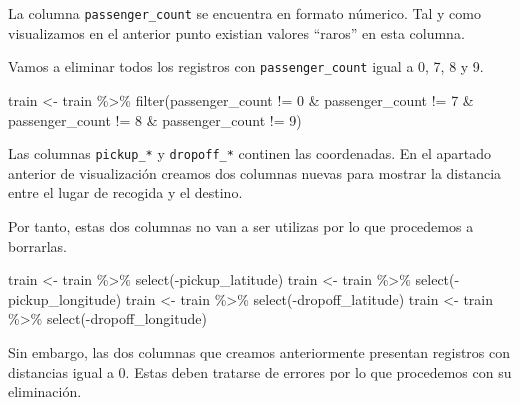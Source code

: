 \documentclass[
]{article}
\newenvironment{Shaded}{\begin{snugshade}}{\end{snugshade}}
\newcommand{\DecValTok}[1]{\textcolor[rgb]{0.00,0.00,0.81}{#1}}
\newcommand{\FunctionTok}[1]{\textcolor[rgb]{0.00,0.00,0.00}{#1}}
\newcommand{\NormalTok}[1]{#1}
\newcommand{\OtherTok}[1]{\textcolor[rgb]{0.56,0.35,0.01}{#1}}
\newcommand{\SpecialCharTok}[1]{\textcolor[rgb]{0.00,0.00,0.00}{#1}}
\begin{document}
La columna \texttt{passenger\_count} se encuentra en formato númerico.
Tal y como visualizamos en el anterior punto existian valores ``raros''
en esta columna.

Vamos a eliminar todos los registros con \texttt{passenger\_count} igual
a 0, 7, 8 y 9.

\begin{Shaded}
\begin{Highlighting}[]
\NormalTok{train }\OtherTok{\textless{}{-}}\NormalTok{ train }\SpecialCharTok{\%\textgreater{}\%} \FunctionTok{filter}\NormalTok{(passenger\_count }\SpecialCharTok{!=} \DecValTok{0} \SpecialCharTok{\&}\NormalTok{ passenger\_count }\SpecialCharTok{!=} \DecValTok{7} \SpecialCharTok{\&}\NormalTok{ passenger\_count }\SpecialCharTok{!=} \DecValTok{8} \SpecialCharTok{\&}\NormalTok{ passenger\_count }\SpecialCharTok{!=} \DecValTok{9}\NormalTok{)}
\end{Highlighting}
\end{Shaded}

Las columnas \texttt{pickup\_*} y \texttt{dropoff\_*} continen las
coordenadas. En el apartado anterior de visualización creamos dos
columnas nuevas para mostrar la distancia entre el lugar de recogida y
el destino.

Por tanto, estas dos columnas no van a ser utilizas por lo que
procedemos a borrarlas.

\begin{Shaded}
\begin{Highlighting}[]
\NormalTok{train }\OtherTok{\textless{}{-}}\NormalTok{ train }\SpecialCharTok{\%\textgreater{}\%} \FunctionTok{select}\NormalTok{(}\SpecialCharTok{{-}}\NormalTok{pickup\_latitude)}
\NormalTok{train }\OtherTok{\textless{}{-}}\NormalTok{ train }\SpecialCharTok{\%\textgreater{}\%} \FunctionTok{select}\NormalTok{(}\SpecialCharTok{{-}}\NormalTok{pickup\_longitude)}
\NormalTok{train }\OtherTok{\textless{}{-}}\NormalTok{ train }\SpecialCharTok{\%\textgreater{}\%} \FunctionTok{select}\NormalTok{(}\SpecialCharTok{{-}}\NormalTok{dropoff\_latitude)}
\NormalTok{train }\OtherTok{\textless{}{-}}\NormalTok{ train }\SpecialCharTok{\%\textgreater{}\%} \FunctionTok{select}\NormalTok{(}\SpecialCharTok{{-}}\NormalTok{dropoff\_longitude)}
\end{Highlighting}
\end{Shaded}

Sin embargo, las dos columnas que creamos anteriormente presentan
registros con distancias igual a 0. Estas deben tratarse de errores por
lo que procedemos con su eliminación.
\end{document}
